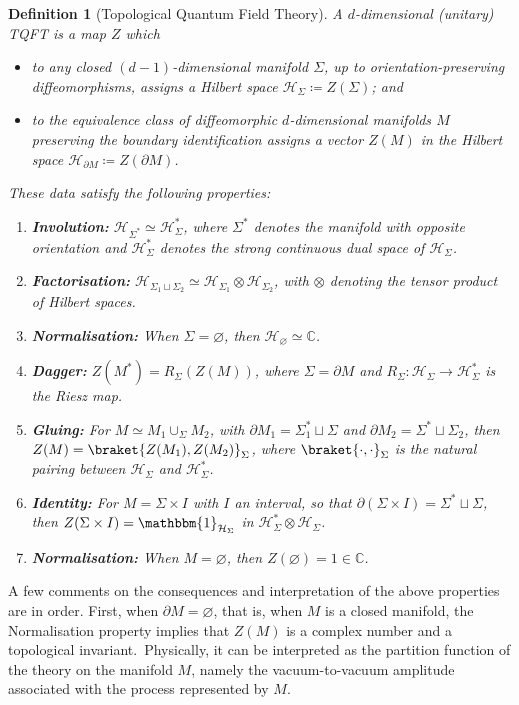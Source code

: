 \documentclass[11pt]{article}
\newcommand{\C}{\mathbb{C}}
\newcommand{\del}{\partial}
\newtheorem{definition}{Definition}[section]
\theoremstyle{definition}
\numberwithin{equation}{section}
\begin{document}
\begin{definition}[Topological Quantum Field Theory]
\label{def:TQFT}
    A $d$-dimensional (unitary) TQFT is a map $Z$ which
    \begin{itemize}
        \item to any closed $(d-1)$-dimensional manifold $\Sigma$, up to orientation-preserving diffeomorphisms, assigns a Hilbert space $\mathcal H_{\Sigma}\coloneqq Z(\Sigma)$; and
        \item to the equivalence class of diffeomorphic $d$-dimensional manifolds $M$ preserving the boundary identification assigns a vector $Z(M)$ in the Hilbert space $\mathcal H_{\partial M}\coloneqq Z(\del M)$.
    \end{itemize}
    These data satisfy the following properties:
    \begin{enumerate}
        \item \textbf{Involution:} $\mathcal H_{\Sigma^*}\simeq \mathcal H_{\Sigma}^*$, where $\Sigma^*$ denotes the manifold with opposite orientation and $\mathcal H_{\Sigma}^*$ denotes the strong continuous dual space of $\mathcal H_{\Sigma}$.
        \item \textbf{Factorisation:} $\mathcal H_{\Sigma_1\sqcup\Sigma_2}\simeq \mathcal H_{\Sigma_1}\otimes\mathcal H_{\Sigma_2}$, with $\otimes$ denoting the tensor product of Hilbert spaces.
        \item \textbf{Normalisation:} When $\Sigma=\varnothing$, then $\mathcal H_{\varnothing}\simeq \C$.
        \item \textbf{Dagger:} $Z(M^*)=R_{\Sigma}(Z(M))$, where $\Sigma=\del M$ and $R_{\Sigma}:\mathcal H_{\Sigma}\to \mathcal H_{\Sigma}^*$ is the Riesz map.
        \item \textbf{Gluing:} For $M\simeq M_1\cup_{\Sigma} M_2$, with $\del M_1=\Sigma_1^*\sqcup \Sigma$ and $\del M_2=\Sigma^*\sqcup \Sigma_2$, then $Z(M)=\braket{Z(M_1),Z(M_2)}_{\Sigma}$, where $\braket{\cdot,\cdot}_\Sigma$ is the natural pairing between $\mathcal H_{\Sigma}$ and $\mathcal H_{\Sigma}^*$.
        \item \textbf{Identity:} For $M=\Sigma\times I$ with $I$ an interval, so that $\del(\Sigma\times I)=\Sigma^*\sqcup\Sigma$, then $Z(\Sigma\times I)=\mathbbm{1}_{\mathcal H_{\Sigma}}$ in $\mathcal H_{\Sigma}^*\otimes \mathcal H_{\Sigma}$.
        \item \textbf{Normalisation:} When $M=\varnothing$, then $Z(\varnothing)=1\in \C$.
    \end{enumerate}
\end{definition}
A few comments on the consequences and interpretation of the above properties are in order. First, when $\partial M = \varnothing$, that is, when $M$ is a closed manifold, the Normalisation property implies that $Z(M)$ is a complex number and a topological invariant.~Physically, it can be interpreted as the partition function of the theory on the manifold $M$, namely the vacuum-to-vacuum amplitude associated with the process represented by $M$.
\end{document}
